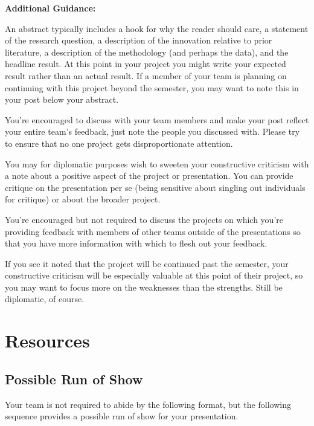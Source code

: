 \noindent

\textbf{Additional Guidance:} 

An abstract typically includes a hook for why the reader should care, a statement of the research question, a description of the innovation relative to prior literature, a description of the methodology (and perhaps the data), and the headline result. At this point in your project you might write your expected result rather than an actual result. If a member of your team is planning on continuing with this project beyond the semester, you may want to note this in your post below your abstract.

You're encouraged to discuss with your team members and make your post reflect your entire team's feedback, just note the people you discussed with. Please try to ensure that no one project gets disproportionate attention.

You may for diplomatic purposes wish to sweeten your constructive criticism with a note about a positive aspect of the project or presentation. You can provide critique on the presentation per se (being sensitive about singling out individuals for critique) or about the broader project. 

You're encouraged but not required to discuss the projects on which you're providing feedback with members of other teams outside of the presentations so that you have more information with which to flesh out your feedback. 

If you see it noted that the project will be continued past the semester, your constructive criticism will be especially valuable at this point of their project, so you may want to focus more on the weaknesses than the strengths. Still be diplomatic, of course.

\section{Resources}

\subsection{Possible Run of Show}\label{sec:runofshow}
Your team is not required to abide by the following format, but the following sequence provides a possible run of show for your presentation.

